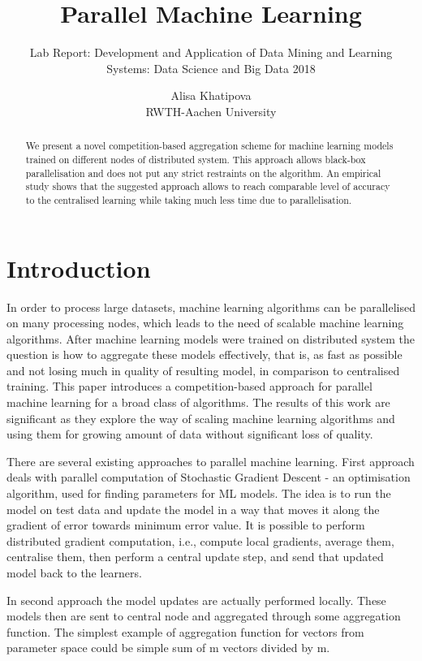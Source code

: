 \documentclass{scrartcl}
\title{Parallel Machine Learning}
\subtitle{Lab Report: Development and Application of Data Mining and Learning Systems: Data Science and Big Data 2018}
\date{}
\author{
Alisa Khatipova\\
RWTH-Aachen University
}
\begin{document}
\maketitle

\begin{abstract}
We present a novel competition-based aggregation scheme for machine learning models trained on different nodes of distributed system.  This approach allows black-box parallelisation and does not put any strict restraints on the algorithm. An empirical study shows that the suggested approach allows to reach comparable level of accuracy to the centralised learning while taking much less time due to parallelisation.
\end{abstract}

\section{Introduction}
In order to process large datasets, machine learning algorithms can be parallelised on many processing nodes, which leads to the need of scalable machine learning algorithms. After machine learning models were trained on distributed system the question is how to aggregate these models effectively, that is, as fast as possible and not losing much in quality of resulting model, in comparison to centralised training. 
This paper introduces a competition-based approach for parallel machine learning for a broad class of algorithms. The results of this work are significant as they explore the way of scaling machine learning algorithms and using them for growing amount of data without significant loss of quality.

There are several existing approaches to parallel machine learning.
First approach deals with parallel computation of Stochastic Gradient Descent - an optimisation algorithm, used for finding parameters for ML models. The idea is to run the model on test data and update the model in a way that moves it along the gradient of error towards minimum error value. It is possible to perform distributed gradient computation, i.e., compute local gradients, average them, centralise them, then perform a central update step, and send that updated model back to the learners.

In second approach the model updates are actually performed locally. These models then are sent to central node and aggregated through some aggregation function. The simplest example of aggregation function for vectors from parameter space could be simple sum of m vectors divided by m.
\end{document}
